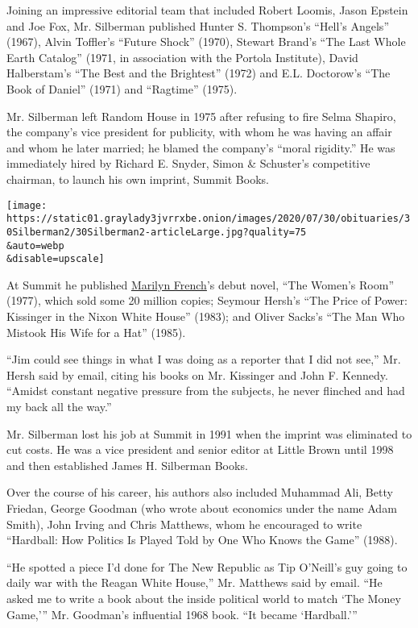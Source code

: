 Joining an impressive editorial team that included Robert Loomis, Jason
Epstein and Joe Fox, Mr. Silberman published Hunter S. Thompson's
``Hell's Angels'' (1967), Alvin Toffler's ``Future Shock'' (1970),
Stewart Brand's ``The Last Whole Earth Catalog'' (1971, in association
with the Portola Institute), David Halberstam's ``The Best and the
Brightest'' (1972) and E.L. Doctorow's ``The Book of Daniel'' (1971) and
``Ragtime'' (1975).

Mr. Silberman left Random House in 1975 after refusing to fire Selma
Shapiro, the company's vice president for publicity, with whom he was
having an affair and whom he later married; he blamed the company's
``moral rigidity.'' He was immediately hired by Richard E. Snyder, Simon
\& Schuster's competitive chairman, to launch his own imprint, Summit
Books.

\texttt{[image: https://static01.graylady3jvrrxbe.onion/images/2020/07/30/obituaries/30Silberman2/30Silberman2-articleLarge.jpg?quality=75\\\&auto=webp\\\&disable=upscale]}

At Summit he published
\href{https://www.nytimes3xbfgragh.onion/2009/05/04/arts/04french.html}{Marilyn
French}'s debut novel, ``The Women's Room'' (1977), which sold some 20
million copies; Seymour Hersh's ``The Price of Power: Kissinger in the
Nixon White House'' (1983); and Oliver Sacks's ``The Man Who Mistook His
Wife for a Hat'' (1985).

``Jim could see things in what I was doing as a reporter that I did not
see,'' Mr. Hersh said by email, citing his books on Mr. Kissinger and
John F. Kennedy. ``Amidst constant negative pressure from the subjects,
he never flinched and had my back all the way.''

Mr. Silberman lost his job at Summit in 1991 when the imprint was
eliminated to cut costs. He was a vice president and senior editor at
Little Brown until 1998 and then established James H. Silberman Books.

Over the course of his career, his authors also included Muhammad Ali,
Betty Friedan, George Goodman (who wrote about economics under the name
Adam Smith), John Irving and Chris Matthews, whom he encouraged to write
``Hardball: How Politics Is Played Told by One Who Knows the Game''
(1988).

``He spotted a piece I'd done for The New Republic as Tip O'Neill's guy
going to daily war with the Reagan White House,'' Mr. Matthews said by
email. ``He asked me to write a book about the inside political world to
match `The Money Game,''' Mr. Goodman's influential 1968 book. ``It
became `Hardball.'''

